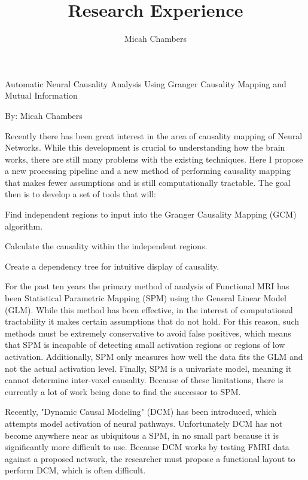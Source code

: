 \documentclass[12pt]{article}
\author{Micah Chambers}
\title{Research Experience}
\begin{document}
\Large
\begin{center}
Automatic Neural Causality Analysis Using Granger Causality Mapping and Mutual Information

\large
By: Micah Chambers
\end{center}
\normalsize

Recently there has been great interest in the area of causality
mapping of Neural Networks. While this development
is crucial to understanding how the brain works,
there are still many problems with the existing techniques.
Here I propose a new processing pipeline and a new method of performing
causality mapping that makes fewer assumptions 
and is still computationally tractable. The goal then is to
develop a set of tools that will:

\begin{enumerate*}
\item Find independent regions to input into the Granger Causality Mapping (GCM) algorithm.
\item Calculate the causality within the independent regions.
\item Create a dependency tree for intuitive display of causality.
\end{enumerate*}

For the past ten years the primary method of analysis of Functional
MRI has been Statistical Parametric Mapping (SPM) using 
the General Linear Model (GLM). While this method
has been effective, in the interest of computational tractability
it makes certain assumptions that do not hold. For this reason, such
methods must be extremely conservative to avoid false positives, which means
that SPM is incapable of detecting small activation regions or regions of low 
activation. Additionally, SPM
only measures how well the data fits the GLM and not the actual activation
level. Finally, SPM is a univariate model, meaning it cannot determine
inter-voxel causality.  Because of these limitations, there is currently 
a lot of work being done to find the successor to SPM. 

Recently, "Dynamic Causal Modeling" (DCM) has been introduced, which attempts 
model activation of neural pathways.
Unfortunately DCM has not become anywhere near as ubiquitous a SPM, in no
small part because it is significantly more difficult to use. Because DCM works by 
testing FMRI data against a proposed network, the researcher must propose
a functional layout to perform DCM, which is often difficult.
\end{document}
